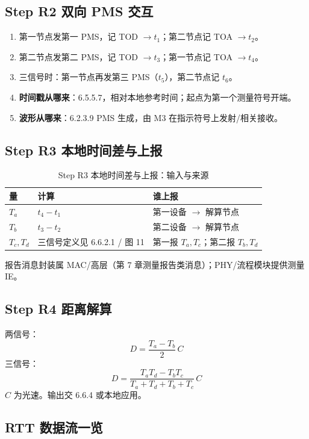 \documentclass[11pt,a4paper]{ctexart}
\begin{document}
\subsection{Step R2 双向 PMS 交互}

\begin{enumerate}
  \item 第一节点发第一 PMS，记 TOD $\rightarrow t_1$；第二节点记 TOA $\rightarrow t_2$。
  \item 第二节点发第二 PMS，记 TOD $\rightarrow t_3$；第一节点记 TOA $\rightarrow t_4$。
  \item 三信号时：第一节点再发第三 PMS（$t_5$），第二节点记 $t_6$。
  \item \textbf{时间戳从哪来}：6.5.5.7，相对本地参考时间；起点为第一个测量符号开端。
  \item \textbf{波形从哪来}：6.2.3.9 PMS 生成，由 M3 在指示符号上发射/相关接收。
\end{enumerate}

\subsection{Step R3 本地时间差与上报}

\begin{longtable}{L{2.2cm}L{4cm}L{6.5cm}}
\caption{Step R3 本地时间差与上报：输入与来源\label{tab:step103}} \\
\toprule
\textbf{量} & \textbf{计算} & \textbf{谁上报} \\
\midrule
$T_a$ & $t_4-t_1$ & 第一设备 $\rightarrow$ 解算节点 \\
$T_b$ & $t_3-t_2$ & 第二设备 $\rightarrow$ 解算节点 \\
$T_c,T_d$ & 三信号定义见 6.6.2.1 / 图 11 & 第一报 $T_a,T_c$；第二报 $T_b,T_d$ \\
\bottomrule
\end{longtable}

报告消息封装属 MAC/高层（第 7 章测量报告类消息）；PHY/流程模块提供测量 IE。

\subsection{Step R4 距离解算}

两信号：
\[
D=\frac{T_a-T_b}{2}\,C
\]
三信号：
\[
D=\frac{T_a T_d-T_b T_c}{T_a+T_d+T_b+T_c}\,C
\]
$C$ 为光速。输出交 6.6.4 或本地应用。

\subsection{RTT 数据流一览}
\end{document}
